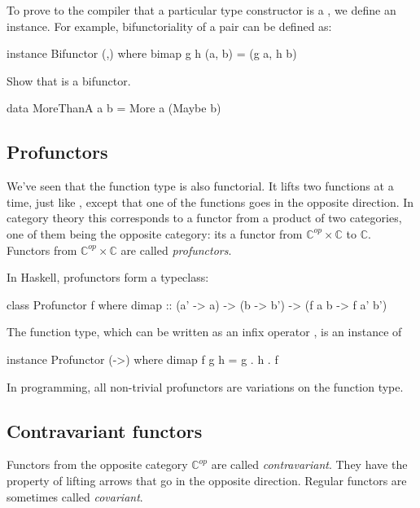\documentclass[DaoFP]{subfiles}
\begin{document}
To prove to the compiler that a particular type constructor is a , we define an instance. For example, bifunctoriality of a pair can be defined as:
\begin{haskell}
instance Bifunctor (,) where
  bimap g h (a, b) = (g a, h b)
\end{haskell}

\begin{exercise}
Show that  is a bifunctor.
\begin{haskell}
data MoreThanA a b = More a (Maybe b)
\end{haskell}
\end{exercise}


\subsection{Profunctors}

We've seen that the function type is also functorial. It lifts two functions at a time, just like , except that one of the functions goes in the opposite direction. In category theory this corresponds to a functor from a product of two categories, one of them being the opposite category: its a functor from $\mathbb{C}^{op} \times \mathbb{C}$ to $\mathbb{C}$. Functors from $\mathbb{C}^{op} \times \mathbb{C}$ are called \emph{profunctors}.

In Haskell, profunctors form a typeclass:
\begin{haskell}
class Profunctor f where
  dimap :: (a' -> a) -> (b -> b') -> (f a b -> f a' b')
\end{haskell}

The function type, which can be written as an infix operator \hask{(->)}, is an instance of 
\begin{haskell}
instance Profunctor (->) where
  dimap f g h = g . h . f
\end{haskell}

In programming, all non-trivial profunctors are variations on the function type. 

\subsection{Contravariant functors}

Functors from the opposite category $\mathbb{C}^{op}$ are called \emph{contravariant}. They have the property of lifting arrows that go in the opposite direction. Regular functors are sometimes called \emph{covariant}.
\end{document}
